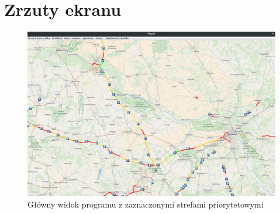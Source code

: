 \section{Zrzuty ekranu}
\begin{figure}
  \centering
  \includegraphics[width=\textwidth]{images/mopnik/widok_glowny.png}
  \caption{Główny widok programu z zaznaczonymi strefami priorytetowymi}
\end{figure}
